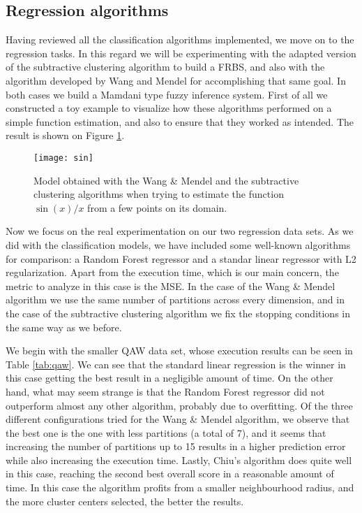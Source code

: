 \subsection{Regression algorithms}

Having reviewed all the classification algorithms implemented, we move on to the regression tasks. In this regard we will be experimenting with the adapted version of the subtractive clustering algorithm to build a FRBS, and also with the algorithm developed by Wang and Mendel for accomplishing that same goal. In both cases we build a Mamdani type fuzzy inference system. First of all we constructed a toy example to visualize how these algorithms performed on a simple function estimation, and also to ensure that they worked as intended. The result is shown on Figure \ref{fig:sin}.

\begin{figure}[h!]
\centering
\texttt{[image: sin]}
\caption{Model obtained with the Wang \& Mendel and the subtractive clustering algorithms when trying to estimate the function $\sin(x)/x$ from a few points on its domain.}
\label{fig:sin}
\end{figure}

Now we focus on the real experimentation on our two regression data sets. As we did with the classification models, we have included some well-known algorithms for comparison: a Random Forest regressor and a standar linear regressor with L2 regularization. Apart from the execution time, which is our main concern, the metric to analyze in this case is the MSE. In the case of the Wang \& Mendel algorithm we use the same number of partitions across every dimension, and in the case of the subtractive clustering algorithm we fix the stopping conditions in the same way as we before.

We begin with the smaller QAW data set, whose execution results can be seen in Table \ref{tab:qaw}. We can see that the standard linear regression is the winner in this case getting the best result in a negligible amount of time. On the other hand, what may seem strange is that the Random Forest regressor did not outperform almost any other algorithm, probably due to overfitting. Of the three different configurations tried for the Wang \& Mendel algorithm, we observe that the best one is the one with less partitions (a total of 7), and it seems that increasing the number of partitions up to 15 results in a higher prediction error while also increasing the execution time. Lastly, Chiu's algorithm does quite well in this case, reaching the second best overall score in a reasonable amount of time. In this case the algorithm profits from a smaller neighbourhood radius, and the more cluster centers selected, the better the results.

